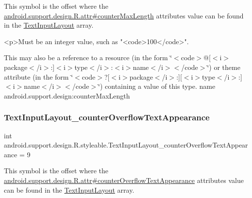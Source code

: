 This symbol is the offset where the \hyperlink{classandroid_1_1support_1_1design_1_1R_1_1attr_a12f7fde0e57068169405793891fc3a8c}{android.\+support.\+design.\+R.\+attr\#counter\+Max\+Length} attribute\textquotesingle{}s value can be found in the \hyperlink{classandroid_1_1support_1_1design_1_1R_1_1styleable_ae01fd2fce65dc8639f3898586b0cedcf}{Text\+Input\+Layout} array.

\begin{DoxyVerb}      <p>Must be an integer value, such as "<code>100</code>".
\end{DoxyVerb}
 

This may also be a reference to a resource (in the form \char`\"{}$<$code$>$@\mbox{[}$<$i$>$package$<$/i$>$\+:\mbox{]}$<$i$>$type$<$/i$>$\+:$<$i$>$name$<$/i$>$$<$/code$>$\char`\"{}) or theme attribute (in the form \char`\"{}$<$code$>$?\mbox{[}$<$i$>$package$<$/i$>$\+:\mbox{]}\mbox{[}$<$i$>$type$<$/i$>$\+:\mbox{]}$<$i$>$name$<$/i$>$$<$/code$>$\char`\"{}) containing a value of this type.  name android.\+support.\+design\+:counter\+Max\+Length \mbox{\label{classandroid_1_1support_1_1design_1_1R_1_1styleable_a3edf526a4c547c24a4dbce7a67d32646}} 
\subsubsection{\texorpdfstring{Text\+Input\+Layout\+\_\+counter\+Overflow\+Text\+Appearance}{TextInputLayout\_counterOverflowTextAppearance}}
{\footnotesize\ttfamily int android.\+support.\+design.\+R.\+styleable.\+Text\+Input\+Layout\+\_\+counter\+Overflow\+Text\+Appearance = 9\hspace{0.3cm}{\ttfamily [static]}}

This symbol is the offset where the \hyperlink{classandroid_1_1support_1_1design_1_1R_1_1attr_afd340be60d52f269d6b3ea3f260cef5d}{android.\+support.\+design.\+R.\+attr\#counter\+Overflow\+Text\+Appearance} attribute\textquotesingle{}s value can be found in the \hyperlink{classandroid_1_1support_1_1design_1_1R_1_1styleable_ae01fd2fce65dc8639f3898586b0cedcf}{Text\+Input\+Layout} array.

